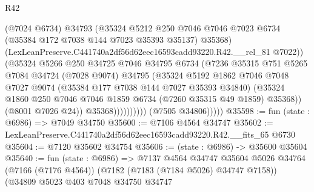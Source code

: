 \begin{lexlean}{R42}
\begin{coremodule}
{                                (@7024 @6734)
                                @34793
                                (@35324
                                  @5212
                                  @250
                                  @7046
                                  @7046
                                  @7023
                                  @6734
                                  (@35384 @172 @7038 @144 @7023 @35393 @35137)
                                  @35368)
                                (LexLeanPreserve.C441740a2df56d62eec16593cadd93220.R42.__rel_81
                                  @7022))
                              (@35324
                                @5266
                                @250
                                @34725
                                @7046
                                @34795
                                @6734
                                (@7236
                                  @35315
                                  @751
                                  @5265
                                  @7084
                                  @34724
                                  (@7028 @9074)
                                  @34795
                                  (@35324
                                    @5192
                                    @1862
                                    @7046
                                    @7048
                                    @7027
                                    @9074
                                    (@35384 @177 @7038 @144 @7027 @35393 @34840)
                                    (@35324
                                      @1860
                                      @250
                                      @7046
                                      @7046
                                      @1859
                                      @6734
                                      (@7260 @35315 @49 @1859)
                                      @35368))
                                  (@8001 @7026 @24))
                                @35368))))))))))
            (@7505 @34806)))))
@35598 := fun (state : @6986) => @7049 @34750
@35600 := @7106 @4564 @34747
@35602 := LexLeanPreserve.C441740a2df56d62eec16593cadd93220.R42.__fits_65 @6730
@35604 := @7120 @35602 @34754
@35606 := (state : @6986) -> @35600 @35604
@35640 := fun (state : @6986) =>
  @7137
    @4564
    @34747
    @35604
    @5026
    @34764
    (@7166 (@7176 @4564))
    (@7182 (@7183 (@7184 @5026) @34747 @7158))
    (@34809
      @5023
      @403
      @7048
      @34750
      @34747
}
\end{coremodule}
\end{lexlean}

